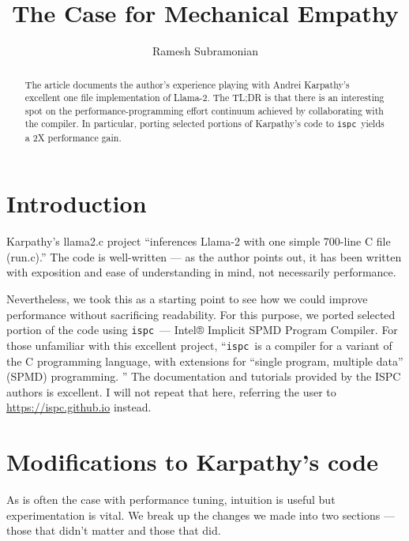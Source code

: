 \documentclass[letterpaper,12pt]{article}
\newcommand{\ISPC}{{\tt ispc}}
\begin{document}
\title{The Case for Mechanical Empathy}
\author{Ramesh Subramonian }
\maketitle
\thispagestyle{fancy}
\lhead{}
\chead{}
\rhead{}
\cfoot{}
\rfoot{{\small \thepage}}

\begin{abstract}

  The article documents the author's experience playing with Andrei
  Karpathy's excellent one file implementation of Llama-2. The TL;DR
  is that there is an interesting spot on the performance-programming
  effort continuum achieved by collaborating with the compiler. In
  particular, porting selected portions of Karpathy's code to \ISPC\
  yields a 2X performance gain.


\end{abstract}

\section{Introduction}

Karpathy's llama2.c project ``inferences Llama-2 with one simple
700-line C file (run.c).''  The code is well-written --- as the author
points out, it has been written with exposition and ease of
understanding in mind, not necessarily performance.

Nevertheless, we took this as a starting point to see how we could improve
performance without sacrificing readability. For this purpose, 
we ported selected portion of the code using \ISPC\ --- Intel®
Implicit SPMD Program Compiler. For those unfamiliar with this excellent 
project, ``\ISPC\ is
a compiler for a variant of the C programming language, with extensions for
``single program, multiple data'' (SPMD) programming. ''
The documentation and tutorials provided by the ISPC authors is excellent. I
will not repeat that here, referring the user to \url{https://ispc.github.io}
instead. 

\section{Modifications to Karpathy's code}

As is often the case with performance tuning, intuition is useful but
experimentation is vital. 
We break up the changes we made into two sections ---
those that didn't matter and those that did.
\end{document}
